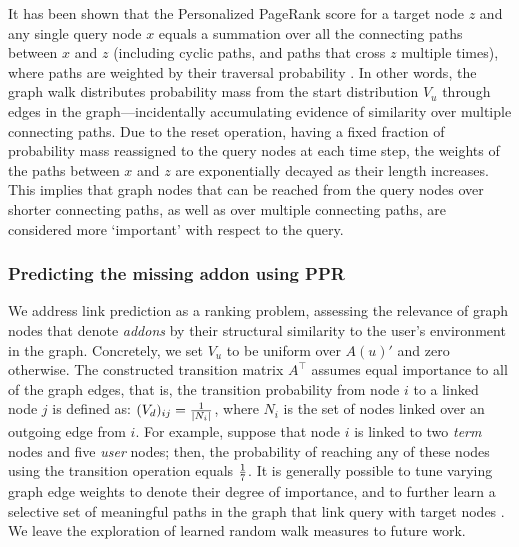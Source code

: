 \documentclass[ijoc,nonblindrev]{informs3} %
\numberwithin{equation}{subsection}
\begin{document}
It has been shown that the Personalized PageRank score for a target node $z$ and any single query node $x$ equals a summation over all the connecting paths between $x$ and $z$ (including cyclic paths, and paths that cross $z$ multiple times), where paths are weighted by their traversal probability \citep{jeh2003scaling,fogaras2004towards}. In other words, the graph walk distributes probability mass from the start distribution $V_u$ through edges in the graph---incidentally accumulating evidence of similarity over multiple connecting paths. Due to the reset operation, having a fixed fraction of probability mass reassigned to the query nodes at each time step, the weights of the paths between $x$ and $z$ are exponentially decayed as their length increases. This implies that graph nodes that can be reached from the query nodes over shorter connecting paths, as well as over multiple connecting paths, are considered more `important' with respect to the query. 

\subsubsection{Predicting the missing addon using PPR}

We address link prediction as a ranking problem, assessing the relevance of graph nodes that denote {\it addons} by their structural
similarity to the user's environment in the graph. Concretely, we set $V_u$ to be uniform over $A(u)'$ and zero otherwise. The constructed transition matrix $A^\top$ assumes equal importance to all of
the graph edges, that is, the transition probability from node $i$ to
a linked node $j$ is defined as: $(V_d)_{ij}={1 \over \mid N_i \mid}$,
where $N_i$ is the set of nodes linked over an outgoing edge from $i$. For example, suppose that node $i$ is linked to two {\it term} nodes and five {\it user} nodes; then, the probability of reaching any of these nodes using the transition operation equals ${1\over 7}$. It is generally possible to tune varying graph edge weights to denote their degree of importance, and to further learn a selective set of meaningful paths in the graph that link query with target nodes \citep{minkov2010improving,lao2010relational}. We leave the exploration of learned random walk measures to future work. 
\end{document}
